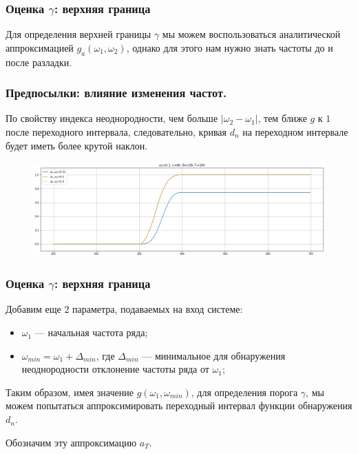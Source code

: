 \documentclass[11pt]{beamer}
\begin{document}
	\begin{frame}
		\frametitle{Оценка $ \gamma $: верхняя граница}
		Для определения верхней границы $ \gamma $ мы можем воспользоваться аналитической аппроксимацией $ g_a(\omega_1, \omega_2) $, однако для этого нам нужно знать частоты до и после разладки.
	\end{frame}

	\begin{frame}
		\frametitle{Предпосылки: влияние изменения частот.}
		По свойству индекса неоднородности, чем больше $ |\omega_2 - \omega_1| $, тем ближе $ g $ к $ 1 $ после переходного интервала, следовательно, кривая $ d_n $ на переходном интервале будет иметь более крутой наклон.
		
		\begin{figure}[b]
			\centering
			\includegraphics[width=\linewidth]{imgs/diff_omega_growth}
		\end{figure}
		
	\end{frame}
	
	\begin{frame}
		\frametitle{Оценка $ \gamma $: верхняя граница}
		Добавим еще $ 2 $ параметра, подаваемых на вход системе:
		\begin{itemize}
			\item $ \omega_1 $ --- начальная частота ряда;
			\item $ \omega_{min} = \omega_1 + \Delta_{min} $, где $ \Delta_{min} $ --- минимальное для обнаружения неоднородности отклонение частоты ряда от $ \omega_1 $;
		\end{itemize}
		
		Таким образом, имея значение $ g(\omega_1, \omega_{min}) $, для определения порога $ \gamma $, мы можем попытаться аппроксимировать переходный интервал функции обнаружения $ d_n $. 
		
		Обозначим эту аппроксимацию $ a_T $.
		
	\end{frame}
	
\end{document}
